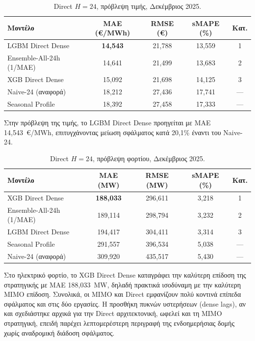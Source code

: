\begin{table}[H]
  \centering
  \caption{Direct $H=24$, πρόβλεψη τιμής, Δεκέμβριος 2025.}
  \label{tab:direct_price_dec}
  \begin{tabular}{lcccc}
    \toprule
    \textbf{Μοντέλο} & \textbf{MAE (€/MWh)} & \textbf{RMSE (€)} & \textbf{sMAPE (\%)} & \textbf{Κατ.} \\
    \midrule
    LGBM Direct Dense        & \textbf{14,543} & 21,788 & 13,559 & 1 \\
    Ensemble-All-24h (1/MAE) & 14,641 & 21,499 & 13,683 & 2 \\
    XGB Direct Dense         & 15,092 & 21,698 & 14,125 & 3 \\
    \midrule
    Naive-24 (αναφορά)       & 18,212 & 27,436 & 17,741 & --- \\
    Seasonal Profile         & 18,392 & 27,458 & 17,333 & --- \\
    \bottomrule
  \end{tabular}
\end{table}

Στην πρόβλεψη της τιμής, το LGBM Direct Dense προηγείται με MAE 14,543~€/MWh,
επιτυγχάνοντας μείωση σφάλματος κατά 20,1\% έναντι του Naive-24.

\begin{table}[H]
  \centering
  \caption{Direct $H=24$, πρόβλεψη φορτίου, Δεκέμβριος 2025.}
  \label{tab:direct_load_dec}
  \begin{tabular}{lcccc}
    \toprule
    \textbf{Μοντέλο} & \textbf{MAE (MW)} & \textbf{RMSE (MW)} & \textbf{sMAPE (\%)} & \textbf{Κατ.} \\
    \midrule
    XGB Direct Dense         & \textbf{188,033} & 296,611 & 3,218 & 1 \\
    Ensemble-All-24h (1/MAE) & 189,114 & 298,794 & 3,232 & 2 \\
    LGBM Direct Dense        & 194,417 & 304,411 & 3,314 & 3 \\
    \midrule
    Seasonal Profile         & 291,557 & 396,534 & 5,038 & --- \\
    Naive-24 (αναφορά)       & 309,920 & 435,517 & 5,430 & --- \\
    \bottomrule
  \end{tabular}
\end{table}

Στο ηλεκτρικό φορτίο, το XGB Direct Dense καταγράφει την καλύτερη επίδοση της
στρατηγικής με MAE 188,033~MW, δηλαδή πρακτικά ισοδύναμη με την καλύτερη MIMO
επίδοση. Συνολικά, οι MIMO και Direct εμφανίζουν πολύ κοντινά επίπεδα σφάλματος και
στις δύο εργασίες. Η προσθήκη πυκνών υστερήσεων (dense lags), αν και σχεδιάστηκε
αρχικά για την Direct αρχιτεκτονική, ωφελεί και τη MIMO στρατηγική, επειδή παρέχει
λεπτομερέστερη περιγραφή της ενδοημερήσιας δομής χωρίς αναδρομική διάδοση σφάλματος.

